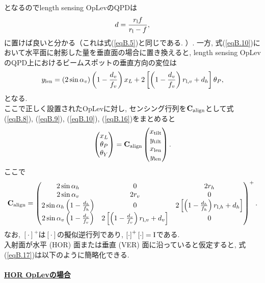となるのでlength sensing OpLevのQPDは
\begin{equation}
d=\frac{r_{\rm l}f}{r_{\rm l}-f},
\label{eqB.15}
\end{equation}
に置けば良いと分かる（これは式(\ref{eqB.5})と同じである. ）. 一方, 式(\ref{eqB.10})において水平面に射影した量を垂直面の場合に置き換えると, length sensing OpLevのQPD上におけるビームスポットの垂直方向の変位は
\begin{equation}
y_{\rm len}=(2\sin\alpha_v)\left(1-\frac{d_v}{f_v}\right)x_L+2\left[\left(1-\frac{d_v}{f_v}\right)r_{{\rm l},v}+d_h\right]\theta_P,
\label{eqB.16}
\end{equation}
となる. \\
\quad ここで正しく設置されたOpLevに対し, センシング行列を${\rm{\textbf{C}}}_{\rm align}$として式(\ref{eqB.8}), (\ref{eqB.9}), (\ref{eqB.10}), (\ref{eqB.16})をまとめると
\begin{equation}
\begin{pmatrix}
x_L\\
\theta_P\\
\theta_Y
\end{pmatrix}
={\rm{\textbf{C}}}_{\rm align}
\begin{pmatrix}
x_{\rm tilt}\\
y_{\rm tilt}\\
x_{\rm len}\\
y_{\rm len}
\end{pmatrix}.
\label{eqB.17}
\end{equation}
ここで
\begin{equation}
{\rm{\textbf{C}}}_{\rm align}=
\begin{pmatrix}
2\sin\alpha_h & 0 & 2r_h\\
2\sin\alpha_v & 2r_v & 0\\
2\sin\alpha_h\left(1-\frac{d_h}{f_h}\right) & 0 & 2\left[\left(1-\frac{d_h}{f_h}\right)r_{{\rm l},h}+d_h\right]\\
2\sin\alpha_v\left(1-\frac{d_v}{f_v}\right) & 2\left[\left(1-\frac{d_v}{f_v}\right)r_{{\rm l},v}+d_v\right] & 0
\end{pmatrix}^+.
\end{equation}
なお, $\left[\cdot\right]^+$は$\left[\cdot\right]$の擬似逆行列であり, $\left[\cdot\right]^+\left[\cdot\right]={\rm{\bm{I}}}$である. \\
入射面が水平 (HOR) 面または垂直 (VER) 面に沿っていると仮定すると, 式(\ref{eqB.17})は以下のように簡略化できる. \\\\
\noindent
\textbf{\underline{HOR OpLevの場合}}\\
